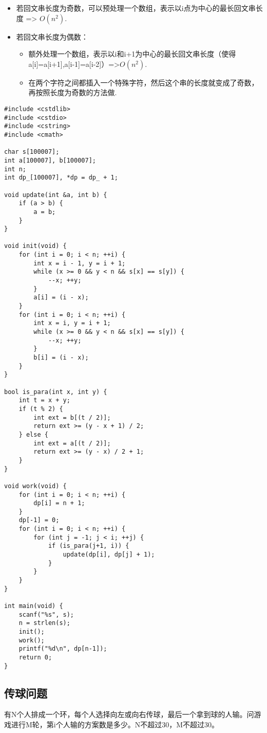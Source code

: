 \documentclass{article}
\begin{document}
\begin{itemize}
    \item{若回文串长度为奇数，可以预处理一个数组，表示以i点为中心的最长回文串长度 => $O(n^2)$.}
    \item{若回文串长度为偶数：}
    \begin{itemize}
        \item{额外处理一个数组，表示以i和i+1为中心的最长回文串长度（使得a[i]=a[i+1],a[i-1]=a[i-2]）=>$O(n^2)$.}
        \item{在两个字符之间都插入一个特殊字符，然后这个串的长度就变成了奇数，再按照长度为奇数的方法做.}
    \end{itemize}
\end{itemize}
\begin{verbatim}
#include <cstdlib>
#include <cstdio>
#include <cstring>
#include <cmath>

char s[100007];
int a[100007], b[100007];
int n;
int dp_[100007], *dp = dp_ + 1;

void update(int &a, int b) {
    if (a > b) {
        a = b;
    }
}

void init(void) {
    for (int i = 0; i < n; ++i) {
        int x = i - 1, y = i + 1;
        while (x >= 0 && y < n && s[x] == s[y]) {
            --x; ++y;
        }
        a[i] = (i - x);
    }
    for (int i = 0; i < n; ++i) {
        int x = i, y = i + 1;
        while (x >= 0 && y < n && s[x] == s[y]) {
            --x; ++y;
        }
        b[i] = (i - x);
    }
}

bool is_para(int x, int y) {
    int t = x + y;
    if (t % 2) {
        int ext = b[(t / 2)];
        return ext >= (y - x + 1) / 2;
    } else {
        int ext = a[(t / 2)];
        return ext >= (y - x) / 2 + 1;
    }
}

void work(void) {
    for (int i = 0; i < n; ++i) {
        dp[i] = n + 1;
    }
    dp[-1] = 0;
    for (int i = 0; i < n; ++i) {
        for (int j = -1; j < i; ++j) {
            if (is_para(j+1, i)) {
                update(dp[i], dp[j] + 1);
            }
        }
    }
}

int main(void) {
    scanf("%s", s);
    n = strlen(s);
    init();
    work();
    printf("%d\n", dp[n-1]);
    return 0;
}
\end{verbatim}
\subsection{传球问题}
有N个人排成一个环，每个人选择向左或向右传球，最后一个拿到球的人输。问游戏进行M轮，第i个人输的方案数是多少。N不超过30，M不超过30。
\end{document}
